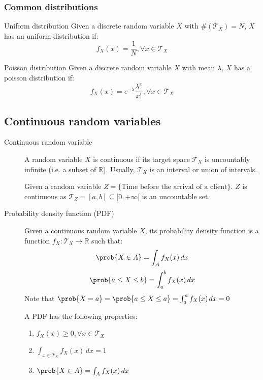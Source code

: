 \subsubsection{Common distributions}
\begin{descriptionlist}
    \item[Uniform distribution] 
        Given a discrete random variable $X$ with $\#(\mathcal{T}_X) = N$,
        $X$ has an uniform distribution if:
        \[ f_X(x) = \frac{1}{N}, \forall x \in \mathcal{T}_X \]
    
    \item[Poisson distribution] 
        Given a discrete random variable $X$ with mean $\lambda$,
        $X$ has a poisson distribution if:
        \[ f_X(x) = e^{-\lambda} \frac{\lambda^x}{x!}, \forall x \in \mathcal{T}_X \]
\end{descriptionlist}


\subsection{Continuous random variables}

\begin{description}
    \item[Continuous random variable] 
        A random variable $X$ is continuous if its target space $\mathcal{T}_X$ is uncountably infinite (i.e. a subset of $\mathbb{R}$).
        Usually, $\mathcal{T}_X$ is an interval or union of intervals.

        \begin{example}
            Given a random variable $Z = \{ \text{Time before the arrival of a client} \}$.
            $Z$ is continuous as $\mathcal{T}_Z = [a, b] \subseteq [0, +\infty[$ is an uncountable set.
        \end{example}

    \item[Probability density function (PDF)] 
        Given a continuous random variable $X$, 
        its probability density function is a function $f_X: \mathcal{T}_X \rightarrow \mathbb{R}$ such that:
        \[ \prob{X \in A} = \int_{A} f_X(x) \,dx \]
        \[ \prob{a \leq X \leq b} = \int_{a}^{b} f_X(x) \,dx \]
        Note that $\prob{X = a} = \prob{a \leq X \leq a} = \int_{a}^{a} f_X(x) \,dx = 0$

        A PDF has the following properties:
        \begin{enumerate}
            \item $f_X(x) \geq 0, \forall x \in \mathcal{T}_X$ 
            \item $\int_{x \in  \mathcal{T}_X} f_X(x) \,dx = 1$
            \item $\prob{X \in A} =  \int_{A} f_X(x) \,dx$
        \end{enumerate}
\end{description}

